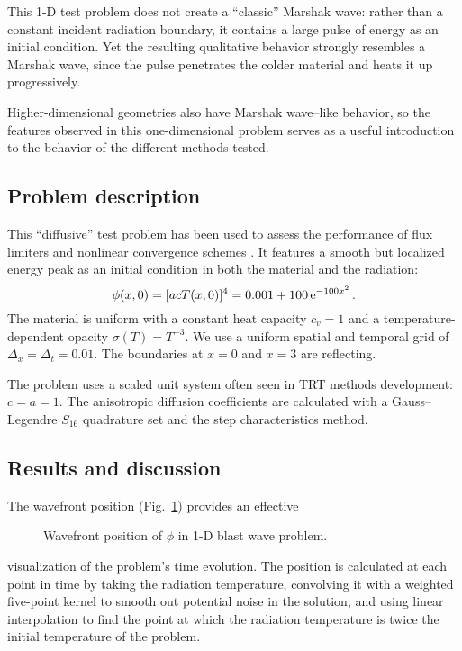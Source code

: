 This 1-D test problem does not create a ``classic'' Marshak wave: rather than a
constant
incident radiation boundary, it contains a large pulse of energy as an initial
condition. Yet the resulting qualitative behavior strongly resembles a Marshak
wave, since the pulse penetrates the colder material and heats it up
progressively.

Higher-dimensional geometries also have Marshak wave--like behavior, so the
features observed in this one-dimensional problem serves as a useful
introduction to the behavior of the different methods tested.

\subsection{Problem description}
This ``diffusive'' test problem has been used to assess the
performance of flux limiters and nonlinear convergence schemes
\cite{Rau2005,Ols2007}. It features a smooth but
localized energy peak as an initial condition in both the material and the
radiation:
\begin{equation*}
  \phi(x,0) = [ a c T(x,0)]^{4} = 0.001 + 100 \mathop{}\!\mathrm{e}^{-100 x^2} \,.
\end{equation*}
The material is uniform with a constant heat capacity $c_v = 1$ and a
temperature-dependent
opacity $\sigma(T) = T^{-3}$. We use a uniform spatial and temporal grid of
$\Delta_x = \Delta_t = 0.01$. The boundaries at $x=0$ and $x=3$ are reflecting.

The problem uses a scaled unit system often seen in TRT methods development: $c
= a = 1$. The anisotropic diffusion coefficients are calculated with a
Gauss--Legendre $S_{16}$ quadrature set and the step characteristics method.

\subsection{Results and discussion}

The wavefront position (Fig.~\ref{fig:1dblastWavefront}) provides an effective
%
\begin{figure}[tb]
  \centering\small
  
  \caption{Wavefront position of $\phi$ in 1-D blast wave problem.}
  \label{fig:1dblastWavefront}
\end{figure}
%
visualization of the problem's time evolution. The position is calculated at
each point in time by taking the radiation temperature, convolving it with a
weighted five-point kernel to smooth out potential noise in the solution, and
using linear interpolation to find the point at which the radiation temperature
is twice the initial temperature of the problem.

